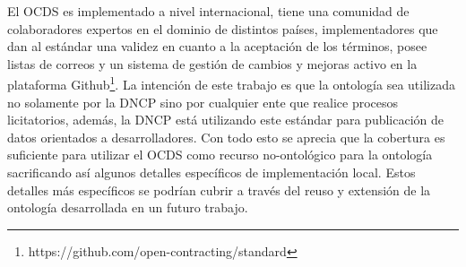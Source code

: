 El OCDS es implementado a nivel internacional, tiene una comunidad de colaboradores expertos en el dominio de distintos países, implementadores que dan al estándar una validez en cuanto a la aceptación de los términos, posee listas de correos y un sistema de gestión de cambios y mejoras activo en la plataforma Github\footnote{https://github.com/open-contracting/standard}. La intención de este trabajo es que la ontología sea utilizada no solamente por la DNCP sino por cualquier ente que realice procesos licitatorios, además, la DNCP está utilizando este estándar para publicación de datos orientados a desarrolladores. Con todo esto se aprecia que la cobertura es suficiente para utilizar el OCDS como recurso no-ontológico para la ontología sacrificando así algunos detalles específicos de implementación local. Estos detalles más específicos se podrían cubrir a través del reuso y extensión de la ontología desarrollada en un futuro trabajo.
